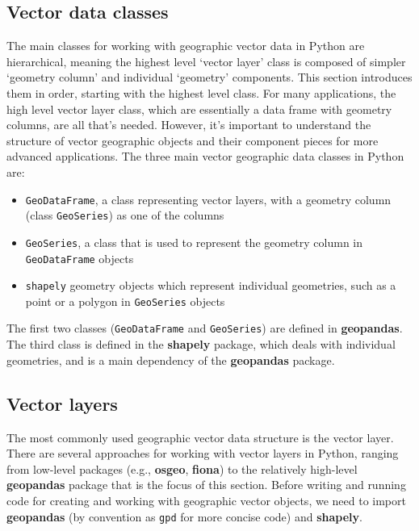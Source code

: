 \documentclass[
  letterpaper,
]{krantz}
\providecommand{\tightlist}{%
  \setlength{\itemsep}{0pt}\setlength{\parskip}{0pt}}\usepackage{longtable,booktabs,array}
\begin{document}
\subsection{Vector data classes}\label{vector-data-classes}

The main classes for working with geographic vector data in Python are
hierarchical, meaning the highest level `vector layer' class is composed
of simpler `geometry column' and individual `geometry' components. This
section introduces them in order, starting with the highest level class.
For many applications, the high level vector layer class, which are
essentially a data frame with geometry columns, are all that's needed.
However, it's important to understand the structure of vector geographic
objects and their component pieces for more advanced applications. The
three main vector geographic data classes in Python are:

\begin{itemize}
\tightlist
\item
  \texttt{GeoDataFrame}, a class representing vector layers, with a
  geometry column (class \texttt{GeoSeries}) as one of the columns
\item
  \texttt{GeoSeries}, a class that is used to represent the geometry
  column in \texttt{GeoDataFrame} objects
\item
  \texttt{shapely} geometry objects which represent individual
  geometries, such as a point or a polygon in \texttt{GeoSeries} objects
\end{itemize}

The first two classes (\texttt{GeoDataFrame} and \texttt{GeoSeries}) are
defined in \textbf{geopandas}. The third class is defined in the
\textbf{shapely} package, which deals with individual geometries, and is
a main dependency of the \textbf{geopandas} package.

\subsection{Vector layers}\label{sec-vector-layers}

The most commonly used geographic vector data structure is the vector
layer. There are several approaches for working with vector layers in
Python, ranging from low-level packages (e.g., \textbf{osgeo},
\textbf{fiona}) to the relatively high-level \textbf{geopandas} package
that is the focus of this section. Before writing and running code for
creating and working with geographic vector objects, we need to import
\textbf{geopandas} (by convention as \texttt{gpd} for more concise code)
and \textbf{shapely}.
\end{document}
